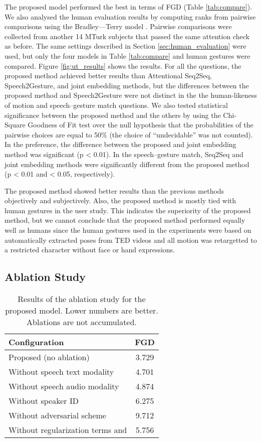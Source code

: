 \documentclass[acmtog]{acmart}
\begin{document}
The proposed model performed the best in terms of FGD (Table \ref{tab:compare}). We also analysed the human evaluation results by computing ranks from pairwise comparisons using the Bradley---Terry model \cite{chu2005extensions}. Pairwise comparisons were collected from another 14 MTurk subjects that passed the same attention check as before. The same settings described in Section \ref{sec:human_evaluation} were used, but only the four models in Table \ref{tab:compare} and human gestures were compared. Figure \ref{fig:ut_results} shows the results. For all the questions, the proposed method achieved better results than Attentional Seq2Seq, Speech2Gesture, and joint embedding methods, but the differences between the proposed method and Speech2Gesture were not distinct in the the human-likeness of motion and speech--gesture match questions. We also tested statistical significance between the proposed method and the others by using the Chi-Square Goodness of Fit test over the null hypothesis that the probabilities of the pairwise choices are equal to 50\% (the choice of ``undecidable'' was not counted). In the preference, the difference between the proposed and joint embedding method was significant (p < 0.01). In the speech--gesture match, Seq2Seq and joint embedding methods were significantly different from the proposed method (p < 0.01 and < 0.05, respectively).

The proposed method showed better results than the previous methods objectively and subjectively. Also, the proposed method is mostly tied with human gestures in the user study. This indicates the superiority of the proposed method, but we cannot conclude that the proposed method performed equally well as humans since the human gestures used in the experiments were based on automatically extracted poses from TED videos and all motion was retargetted to a restricted character without face or hand expressions.

\subsection{Ablation Study}

\begin{table}
\caption{Results of the ablation study for the proposed model. Lower numbers are better. Ablations are not accumulated.}
\label{tab:ablation}
\centering
\begin{tabularx}{\linewidth}{Xc}
  \toprule
  Configuration & FGD\\ 
  \midrule
Proposed (no ablation) & 3.729\\
Without speech text modality & 4.701\\
Without speech audio modality & 4.874\\
Without speaker ID & 6.275\\
Without adversarial scheme & 9.712\\
Without regularization terms  and  & 5.756\\
  \bottomrule
\end{tabularx}
\end{table}
\end{document}
